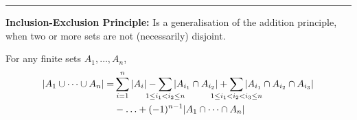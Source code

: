 \documentclass[a4paper]{extarticle}
\newcommand{\Ex}{\textbf{Example:}\ }
\newcommand{\card}[1]{\lvert #1 \rvert}
\newcommand{\floor}[1]{\lfloor #1 \rfloor}
\newcommand{\sep}{\vspace{5pt}\noindent\hrule\vspace{5pt}}
\begin{document}
\begin{multicols*}{2}

\sep

\textbf{Inclusion-Exclusion Principle:} Is a generalisation of the addition
principle, when two or more sets are not (necessarily) disjoint.

For any finite sets $A_1,\ldots,A_n$,
\begin{align*}
|A_1\cup\cdots\cup A_n| = &\sum_{i=1}^{n}|A_i|
- \sum_{\mathclap{1\leq i_1 < i_2 \leq n}}|A_{i_{1}} \cap A_{i_{2}}|
+ \sum_{\mathclap{1\leq i_1 < i_2 < i_3\leq n}}|A_{i_{1}} \cap A_{i_{2}}
\cap A_{i_{3}}|
\\
&- \ldots +(-1)^{n-1}|A_{1} \cap \cdots \cap A_{n}|\\
\end{align*}

\end{multicols*}
\end{document}
